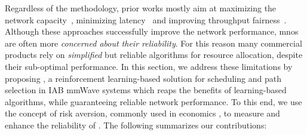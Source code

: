 Regardless of the methodology,  prior works mostly aim at maximizing the network capacity~\cite{pan2017joint, alizadeh2019load, huang2015joint, nguyen2020nonsmooth, rasekh2015interference, kwon2019joint, pizzo2017optimal, kulkarni2018max}, minimizing latency~\cite{vu2018path, ortiz2019scaros} and improving throughput fairness~\cite{alizadeh2019load, pagin2022}. Although these approaches successfully improve the network performance, \glspl{mno} are often more \textit{concerned about their reliability}. 
For this reason many commercial products rely on \textit{simplified} but reliable algorithms for resource allocation, despite their sub-optimal performance. In this section, we address these limitations by proposing \name{}, a reinforcement learning-based solution for scheduling and path selection in IAB mmWave systems which reaps the benefits of learning-based algorithms, while guaranteeing reliable network performance. To this end, we use the concept of risk aversion, commonly used in economics \cite{Rockafellar2000, Levy1998}, to measure and enhance the reliability of \name{}. The following summarizes our contributions: 


